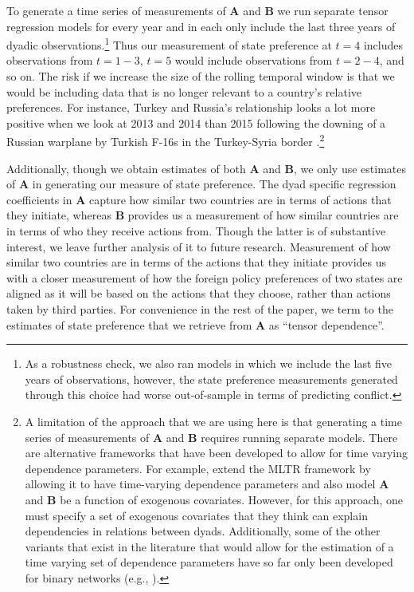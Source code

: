 \documentclass[12pt,pdflatex]{elsarticle}
\newcommand{\bl}[1]{{\mathbf #1}}
\begin{document}
To generate a time series of measurements of $\bl A$ and $\bl B$ we run separate tensor regression models for every year and in each only include the last three years of dyadic observations.\footnote{As a robustness check, we also ran models in which we include the last five years of observations, however, the state preference measurements generated through this choice had worse out-of-sample in terms of predicting conflict.} Thus our measurement of state preference at $t=4$ includes observations from $t=1-3$, $t=5$ would include observations from $t=2-4$, and so on. The risk if we increase the size of the rolling temporal window is that we would be including data that is no longer relevant to a country's relative preferences. For instance, Turkey and Russia's relationship looks a lot more positive when we look at 2013 and 2014 than 2015 following the downing of a Russian warplane by Turkish F-16s in the Turkey-Syria border \citep{bbc:2015}.\footnote{A limitation of the approach that we are using here is that generating a time series of measurements of $\bl A$ and $\bl B$ requires running separate models. There are alternative frameworks that have been developed to allow for time varying dependence parameters. For example, \citet{minhas:etal:2017:arxiv} extend the MLTR framework by allowing it to have time-varying dependence parameters and also model $\bl A$ and $\bl B$ be a function of exogenous covariates. However, for this approach, one must specify a set of exogenous covariates that they think can explain dependencies in relations between dyads. Additionally, some of the other variants that exist in the literature that would allow for the estimation of a time varying set of dependence parameters have so far only been developed for binary networks (e.g., \citealp{durante:etal:2017,park:sohn:2017}).}

Additionally, though we obtain estimates of both $\bl A$ and $\bl B$, we only use estimates of $\bl A$ in generating our measure of state preference. The dyad specific regression coefficients in $\bl A$ capture how similar two countries are in terms of actions that they initiate, whereas $\bl B$ provides us a measurement of how similar countries are in terms of who they receive actions from. Though the latter is of substantive interest, we leave further analysis of it to future research. Measurement of how similar two countries are in terms of the actions that they initiate provides us with a closer measurement of how the foreign policy preferences of two states are aligned as it will be based on the actions that they choose, rather than actions taken by third parties. For convenience in the rest of the paper, we term to the estimates of state preference that we retrieve from $\bl A$ as ``tensor dependence''.
\end{document}

